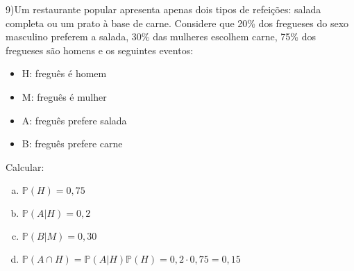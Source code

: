 \documentclass{article}
\begin{document}
\vspace{5px}

9)Um restaurante popular apresenta apenas dois tipos de refeições: salada completa ou um prato
à base de carne. Considere que 20\% dos fregueses do sexo masculino preferem a salada, 30\%
das mulheres escolhem carne, 75\% dos fregueses são homens e os seguintes eventos:

\begin{itemize}
    \item H: freguês é homem
    \item M: freguês é mulher
    \item A: freguês prefere salada
    \item B: freguês prefere carne
\end{itemize}

Calcular:

\begin{enumerate}[a)] %
    \item$ \mathds{P}(H) = 0,75$
    \item $\mathds{P}(A|H) = 0,2$
    \item $\mathds{P}(B|M) = 0,30$
    \item $\mathds{P}(A \cap H) = \mathds{P}(A | H)\mathds{P}(H) = 0,2 \cdot 0,75 = 0,15$
\end{enumerate}

\vspace{5px}
\end{document}
